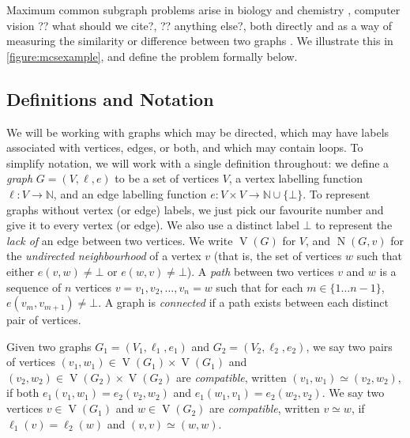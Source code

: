 \documentclass{llncs}
\begin{document}
Maximum common subgraph problems arise in biology and chemistry
\cite{DBLP:journals/jcamd/RaymondW02a,Ehrlich:2011}, computer vision ?? what should we cite?, ??
anything else?, both directly and as a way of measuring the similarity or difference between two
graphs \cite{DBLP:journals/prl/Bunke97,DBLP:journals/prl/FernandezV01,KriegeThesis}. We illustrate
this in \cref{figure:mcsexample}, and define the problem formally below.

\subsection{Definitions and Notation}

We will be working with graphs which may be directed, which may have labels associated with
vertices, edges, or both, and which may contain loops. To simplify notation, we will work with a
single definition throughout: we define a \emph{graph} $G = (V, \ell, e)$ to be a set of vertices
$V$, a vertex labelling function $\ell : V \rightarrow \mathbb{N}$, and an edge labelling function
$e : V \times V \rightarrow \mathbb{N} \cup \{ \bot \}$. To represent graphs without vertex (or
edge) labels, we just pick our favourite number and give it to every vertex (or edge). We also use a
distinct label $\bot$ to represent the \emph{lack of} an edge between two vertices.  We write
$\operatorname{V}(G)$ for $V$, and $\operatorname{N}(G, v)$ for the \emph{undirected neighbourhood}
of a vertex $v$ (that is, the set of vertices $w$ such that either $e(v, w) \ne \bot$ or $e(w, v)
\ne \bot$).  A \emph{path} between two vertices $v$ and $w$ is a sequence of $n$ vertices $v = v_1,
v_2, \ldots, v_n = w$ such that for each $m \in \{ 1 \ldots n - 1 \}$, $e(v_m, v_{m + 1}) \ne \bot$.
A graph is \emph{connected} if a path exists between each distinct pair of vertices.

Given two graphs $G_1 = (V_1, \ell_1, e_1)$ and $G_2 = (V_2, \ell_2, e_2)$, we say two pairs of
vertices $(v_1, w_1) \in \operatorname{V}(G_1) \times \operatorname{V}(G_1)$ and $(v_2, w_2) \in
\operatorname{V}(G_2) \times \operatorname{V}(G_2)$ are \emph{compatible}, written $(v_1, w_1)
\simeq (v_2, w_2)$, if both $e_1(v_1, w_1) = e_2(v_2, w_2)$ and $e_1(w_1, v_1) = e_2(w_2, v_2)$. We
say two vertices $v \in \operatorname{V}(G_1)$ and $w \in \operatorname{V}(G_2)$ are
\emph{compatible}, written $v \simeq w$, if $\ell_1(v) = \ell_2(w)$ and $(v, v) \simeq (w, w)$.
\end{document}
